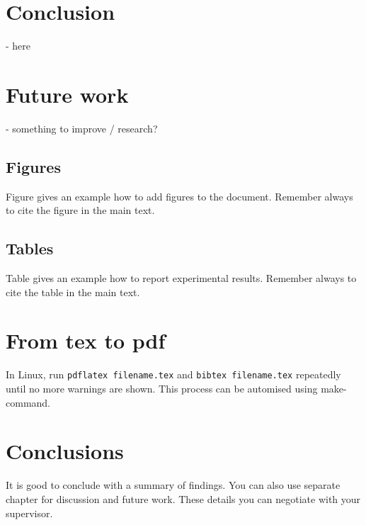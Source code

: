 \chapter{Conclusion}
 - here

\chapter{Future work}
 - something to improve / research?


\section{Figures}
Figure gives an example how to add figures to the document. Remember always to cite the figure in the main text.


\section{Tables}

Table gives an example how to report experimental results. Remember always to cite the table in the main text. 


\chapter{From tex to pdf}

In Linux, run \texttt{pdflatex filename.tex} and \texttt{bibtex filename.tex} repeatedly until no more warnings are shown. This process can be automised using make-command.
 
\chapter{Conclusions\label{chapter:conclusions}}

It is good to conclude with a summary of findings. You can also use separate chapter for discussion and future work. These details you can negotiate with your supervisor.

